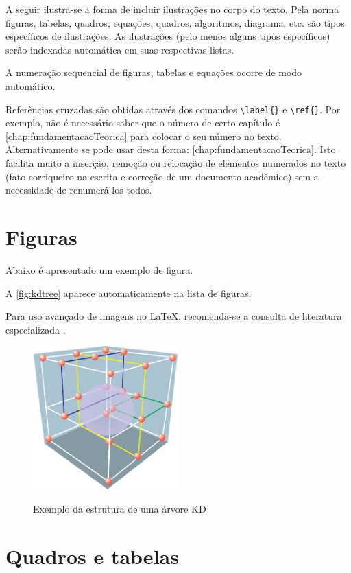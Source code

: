 \begin{apendicesenv}
A seguir ilustra-se a forma de incluir ilustrações no corpo do texto. Pela norma
figuras, tabelas, quadros, equações, quadros, algoritmos, diagrama, etc. são
tipos específicos de ilustrações. As ilustrações (pelo menos alguns tipos
específicos) serão indexadas automática em suas respectivas listas.

A numeração sequencial de figuras, tabelas e equações ocorre de modo automático.

Referências cruzadas são obtidas através dos comandos \verb|\label{}| e
\verb|\ref{}|. Por exemplo, não é necessário saber que o número de certo
capítulo é \ref{chap:fundamentacaoTeorica} para colocar o seu número no texto.
Alternativamente se pode usar desta forma: \autoref{chap:fundamentacaoTeorica}.
Isto facilita muito a inserção, remoção ou relocação de elementos numerados no
texto (fato corriqueiro na escrita e correção de um documento acadêmico) sem a
necessidade de renumerá-los todos.

\section{Figuras}
\label{sec:figuras}

Abaixo é apresentado um exemplo de figura.

A \autoref{fig:kdtree} aparece automaticamente na lista de figuras.

Para uso avançado de imagens no \LaTeX{}, recomenda-se a consulta de literatura
especializada \cite{Goossens2007}.

\begin{figure}[!htb]
    \centering
    \caption{Exemplo da estrutura de uma árvore KD}
    \includegraphics[width=0.5\textwidth]{./4....figures/figura-exemplo}
    \label{fig:kdtree}
\end{figure}

\section{Quadros e tabelas}
\label{sec:tabelas}


\end{apendicesenv}
